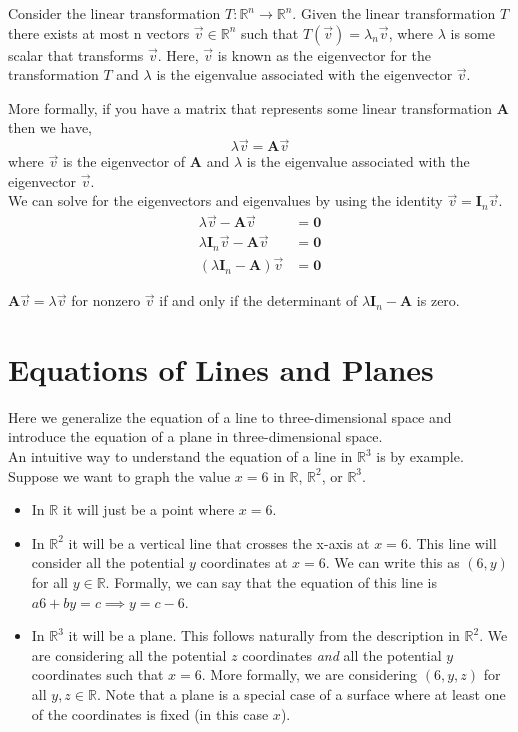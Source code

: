 \documentclass[12pt]{article}
\begin{document}
Consider the linear transformation $T:\mathbb{R}^n\rightarrow\mathbb{R}^n$. Given the linear transformation $T$ there exists at most n vectors $\vec{v}\in\mathbb{R}^n$ such that $T(\vec{v})=\lambda_n \vec{v}$, where $\lambda$ is some scalar that transforms $\vec{v}$. Here, $\vec{v}$ is known as the eigenvector for the transformation $T$ and $\lambda$ is the eigenvalue associated with the eigenvector $\vec{v}$.

More formally, if you have a matrix that represents some linear transformation $\mathbf{A}$ then we have,
\[
\lambda\vec{v}=\mathbf{A}\vec{v}
\]
where $\vec{v}$ is the eigenvector of $\mathbf{A}$ and $\lambda$ is the eigenvalue associated with the eigenvector $\vec{v}$. \\

We can solve for the eigenvectors and eigenvalues by using the identity $\vec{v}=\mathbf{I}_n\vec{v}$.
\begin{align*}
\lambda\vec{v}-\mathbf{A}\vec{v} &= \mathbf{0} \\
\lambda\mathbf{I}_n\vec{v}-\mathbf{A}\vec{v}&= \mathbf{0} \\
(\lambda\mathbf{I}_n-\mathbf{A})\vec{v} &= \mathbf{0}
\end{align*}

$\mathbf{A}\vec{v}=\lambda\vec{v}$ for nonzero $\vec{v}$ if and only if the determinant of $\lambda\mathbf{I}_n-\mathbf{A}$ is zero. \\


\pagebreak
\section{Equations of Lines and Planes}

Here we generalize the equation of a line to three-dimensional space and introduce the equation of a plane in three-dimensional space. \\

 An intuitive way to understand the equation of a line in $\mathbb{R}^3$ is by example. Suppose we want to graph the value $x=6$ in $\mathbb{R}$, $\mathbb{R}^2$, or $\mathbb{R}^3$.
\begin{itemize}
\item In $\mathbb{R}$ it will just be a point where $x=6$.
\item In $\mathbb{R}^2$ it will be a vertical line that crosses the x-axis at $x=6$. This line will consider all the potential $y$ coordinates at $x=6$. We can write this as $(6,y)$ for all $y\in\mathbb{R}$. Formally, we can say that the equation of this line is $a6+by=c\implies y=c-6$.
\item In $\mathbb{R}^3$ it will be a plane. This follows naturally from the description in $\mathbb{R}^2$. We are considering all the potential $z$ coordinates \emph{and} all the potential $y$ coordinates such that $x=6$. More formally, we are considering $(6,y,z)$ for all $y,z\in\mathbb{R}$. Note that a plane is a special case of a surface where at least one of the coordinates is fixed (in this case $x$).
\end{itemize}
\end{document}
